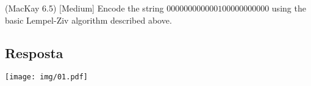 (MacKay 6.5) [Medium]
Encode the string $000000000000100000000000$ using the basic Lempel-Ziv algorithm described above.

\subsection*{Resposta}

\texttt{[image: img/01.pdf]}